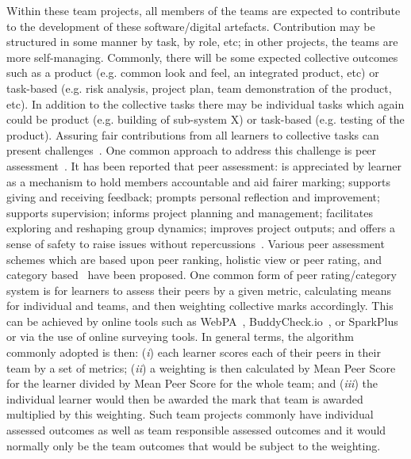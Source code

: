 \documentclass[sigconf, anonymous=false]{acmart}
\begin{document}
Within these team projects, all members of the teams are expected to
contribute to the development of these software/digital
artefacts. Contribution may be structured in some manner by task, by
role, etc; in other projects, the teams are more
self-managing. Commonly, there will be some expected collective
outcomes such as a product (e.g. common look and feel, an integrated
product, etc) or task-based (e.g. risk analysis, project plan, team
demonstration of the product, etc).  In addition to the collective
tasks there may be individual tasks which again could be product
(e.g. building of sub-system X) or task-based (e.g. testing of the
product). Assuring fair contributions from all learners to collective
tasks can present challenges~\cite{Philips21}. One common approach to
address this challenge is peer assessment~\cite{Gordon2010}. It has
been reported that peer assessment: is appreciated by learner as a
mechanism to hold members accountable and aid fairer marking; supports
giving and receiving feedback; prompts personal reflection and
improvement; supports supervision; informs project planning and
management; facilitates exploring and reshaping group dynamics;
improves project outputs; and offers a sense of safety to raise issues
without repercussions~\cite{Mitchell2021}. Various peer assessment
schemes which are based upon peer ranking, holistic view or peer
rating, and category based~\cite{Yanbin2005, Lejk2001} have been
proposed. One common form of peer rating/category system is for
learners to assess their peers by a given metric, calculating means
for individual and teams, and then weighting collective marks
accordingly. This can be achieved by online tools such as
WebPA~\cite{WebPA}, BuddyCheck.io~\cite{BuddyCheck}, or
SparkPlus~\cite{SparkPlus} or via the use of online surveying
tools. In general terms, the algorithm commonly adopted is then:
({\emph{i}}) each learner scores each of their peers in their team by
a set of metrics; ({\emph{ii}}) a weighting is then calculated by Mean
Peer Score for the learner divided by Mean Peer Score for the whole
team; and ({\emph{iii}}) the individual learner would then be awarded
the mark that team is awarded multiplied by this weighting. Such team
projects commonly have individual assessed outcomes as well as team
responsible assessed outcomes and it would normally only be the team
outcomes that would be subject to the weighting.
\end{document}
